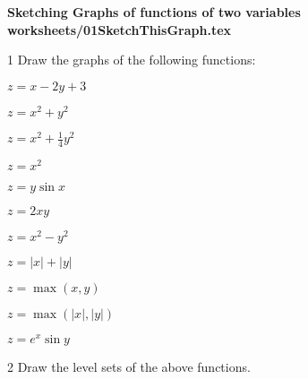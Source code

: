 \begin{center}
    \bfseries\sffamily
    Sketching Graphs of functions of two variables\\
    \ttfamily worksheets/01SketchThisGraph.tex
\end{center}
\begin{multicols}{2}
\begin{trivlist}
\item[1] Draw the graphs of the following functions:

$z=x-2y+3$

$z=x^2+ y^{2}$

$z=x^{2} + \frac14 y^{2}$

$z=x^{2}$

$z=y\sin x$

$z=2xy$

$z=x^2-y^2$

$z=|x|+|y|$

$z=\max (x, y)$

$z=\max(|x|, |y|)$

$z=e^x\sin y$

\item[2] Draw the level sets of the above functions.

\end{trivlist}

\end{multicols}



